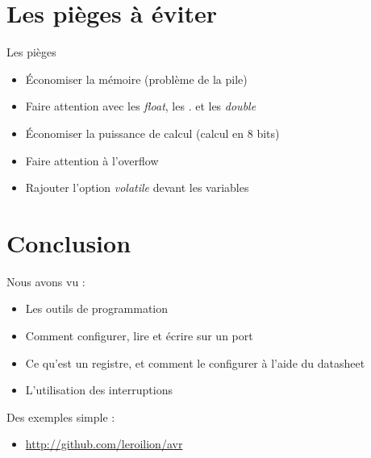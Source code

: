 \documentclass{beamer}
\begin{document}
\section{Les pi\`eges \`a \'eviter}

\begin{frame}
  \begin{alertblock}{Les pi\`eges}
    \pause
    \begin{itemize}
     \item \'Economiser la m\'emoire (probl\`eme de la pile)
     \pause 
     \item Faire attention avec les \emph{float}, les . et les \emph{double}
     \pause
     \item \'Economiser la puissance de calcul (calcul en 8 bits)
     \pause
     \item Faire attention \`a l'overflow
     \pause
     \item Rajouter l'option \emph{volatile} devant les variables
    \end{itemize}

  \end{alertblock}
\end{frame}


\section*{Conclusion}

\begin{frame}
  Nous avons vu :\\
  \begin{itemize}
    \pause
    \item Les outils de programmation
    \pause
    \item Comment configurer, lire et \'ecrire sur un port
    \pause
    \item Ce qu'est un registre, et comment le configurer \`a l'aide du datasheet
    \pause
    \item L'utilisation des interruptions
  \end{itemize}
  \pause 
  Des exemples simple :\\
   \begin{itemize}
    \pause
    \item \hyperlink{http://github.com/leroilion/avr}{http://github.com/leroilion/avr}
   \end{itemize}
\end{frame}
\end{document}
